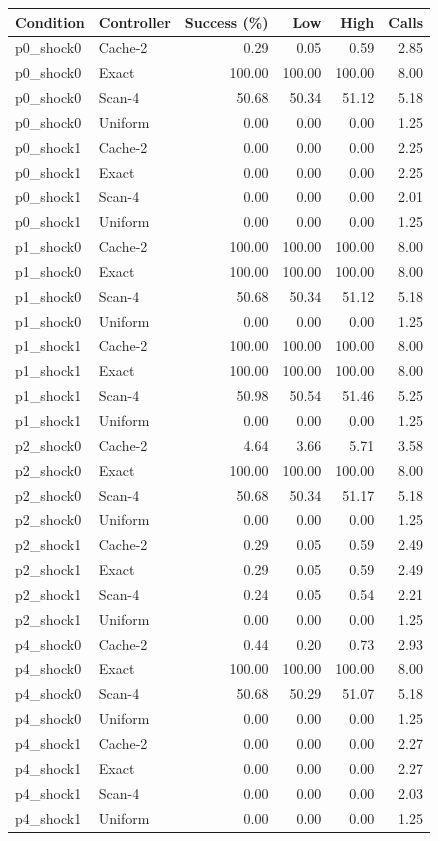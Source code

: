 \begin{longtable}{llrrrr}
\toprule
Condition & Controller & Success (\%) & Low & High & Calls\\
\midrule
\endhead
p0\_shock0 & Cache-2 & 0.29 & 0.05 & 0.59 & 2.85\\
p0\_shock0 & Exact & 100.00 & 100.00 & 100.00 & 8.00\\
p0\_shock0 & Scan-4 & 50.68 & 50.34 & 51.12 & 5.18\\
p0\_shock0 & Uniform & 0.00 & 0.00 & 0.00 & 1.25\\
p0\_shock1 & Cache-2 & 0.00 & 0.00 & 0.00 & 2.25\\
p0\_shock1 & Exact & 0.00 & 0.00 & 0.00 & 2.25\\
p0\_shock1 & Scan-4 & 0.00 & 0.00 & 0.00 & 2.01\\
p0\_shock1 & Uniform & 0.00 & 0.00 & 0.00 & 1.25\\
p1\_shock0 & Cache-2 & 100.00 & 100.00 & 100.00 & 8.00\\
p1\_shock0 & Exact & 100.00 & 100.00 & 100.00 & 8.00\\
p1\_shock0 & Scan-4 & 50.68 & 50.34 & 51.12 & 5.18\\
p1\_shock0 & Uniform & 0.00 & 0.00 & 0.00 & 1.25\\
p1\_shock1 & Cache-2 & 100.00 & 100.00 & 100.00 & 8.00\\
p1\_shock1 & Exact & 100.00 & 100.00 & 100.00 & 8.00\\
p1\_shock1 & Scan-4 & 50.98 & 50.54 & 51.46 & 5.25\\
p1\_shock1 & Uniform & 0.00 & 0.00 & 0.00 & 1.25\\
p2\_shock0 & Cache-2 & 4.64 & 3.66 & 5.71 & 3.58\\
p2\_shock0 & Exact & 100.00 & 100.00 & 100.00 & 8.00\\
p2\_shock0 & Scan-4 & 50.68 & 50.34 & 51.17 & 5.18\\
p2\_shock0 & Uniform & 0.00 & 0.00 & 0.00 & 1.25\\
p2\_shock1 & Cache-2 & 0.29 & 0.05 & 0.59 & 2.49\\
p2\_shock1 & Exact & 0.29 & 0.05 & 0.59 & 2.49\\
p2\_shock1 & Scan-4 & 0.24 & 0.05 & 0.54 & 2.21\\
p2\_shock1 & Uniform & 0.00 & 0.00 & 0.00 & 1.25\\
p4\_shock0 & Cache-2 & 0.44 & 0.20 & 0.73 & 2.93\\
p4\_shock0 & Exact & 100.00 & 100.00 & 100.00 & 8.00\\
p4\_shock0 & Scan-4 & 50.68 & 50.29 & 51.07 & 5.18\\
p4\_shock0 & Uniform & 0.00 & 0.00 & 0.00 & 1.25\\
p4\_shock1 & Cache-2 & 0.00 & 0.00 & 0.00 & 2.27\\
p4\_shock1 & Exact & 0.00 & 0.00 & 0.00 & 2.27\\
p4\_shock1 & Scan-4 & 0.00 & 0.00 & 0.00 & 2.03\\
p4\_shock1 & Uniform & 0.00 & 0.00 & 0.00 & 1.25\\
\bottomrule
\end{longtable}